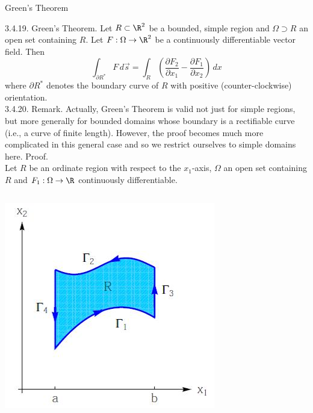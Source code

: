 \documentclass[smaller,hyperref={CJKbookmarks=true}]{beamer}
\begin{document}
\begin{frame}{Green's Theorem}
\begin{spacing}{1.05}
\alert{3.4.19. Green's Theorem.} Let $R\subset\R^2$ be a bounded, simple region and $\Omega\supset R$ an open set containing $R$. Let $F:\Omega\to\R^2$ be a continuously dif{}ferentiable vector field. Then
\setcounter{equation}{0}
\begin{equation}\label{3.4.1}
\int_{\partial R^*}F\,d\vec{s}=\int_R\left(\frac{\partial F_2}{\partial x_1}-\frac{\partial F_1}{\partial x_2}\right)\,dx
\end{equation}
where $\partial R^*$ denotes the boundary curve of $R$ with positive
(counter-clockwise) orientation.\\[9pt]
\alert{3.4.20. Remark.} Actually, Green's Theorem is valid not just for simple
regions, but more generally for bounded domains whose boundary is a
rectifiable curve (i.e., a curve of finite length). However, the proof
becomes much more complicated in this general case and so we restrict
ourselves to simple domains here.
\newpage
\alert{Proof.}\\
Let $R$ be an ordinate region with respect to the $x_1$-axis, $\Omega$ an open set containing $R$ and $F_1:\Omega\to\R$ continuously dif{}ferentiable.
\begin{columns}[onlytextwidth]
\begin{column}{0.3\textwidth}
\includegraphics[width=\columnwidth]{92.jpg}

\end{column}
\end{columns}
\end{spacing}
\end{frame}
\end{document}
